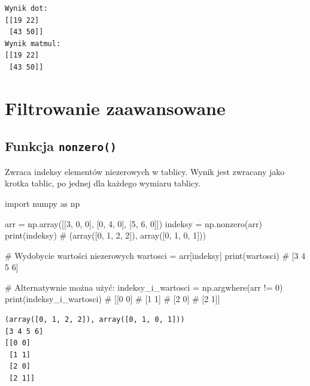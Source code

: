 \documentclass[
  letterpaper,
  DIV=11,
  numbers=noendperiod]{scrreprt}
\newenvironment{Shaded}{\begin{snugshade}}{\end{snugshade}}
\newcommand{\BuiltInTok}[1]{\textcolor[rgb]{0.00,0.23,0.31}{#1}}
\newcommand{\CommentTok}[1]{\textcolor[rgb]{0.37,0.37,0.37}{#1}}
\newcommand{\DecValTok}[1]{\textcolor[rgb]{0.68,0.00,0.00}{#1}}
\newcommand{\ImportTok}[1]{\textcolor[rgb]{0.00,0.46,0.62}{#1}}
\newcommand{\NormalTok}[1]{\textcolor[rgb]{0.00,0.23,0.31}{#1}}
\newcommand{\OperatorTok}[1]{\textcolor[rgb]{0.37,0.37,0.37}{#1}}
\begin{document}
\begin{verbatim}
Wynik dot:
[[19 22]
 [43 50]]
Wynik matmul:
[[19 22]
 [43 50]]
\end{verbatim}

\chapter{Filtrowanie zaawansowane}\label{filtrowanie-zaawansowane}

\section{\texorpdfstring{Funkcja
\texttt{nonzero()}}{Funkcja nonzero()}}\label{funkcja-nonzero}

Zwraca indeksy elementów niezerowych w tablicy. Wynik jest zwracany jako
krotka tablic, po jednej dla każdego wymiaru tablicy.

\begin{Shaded}
\begin{Highlighting}[]
\ImportTok{import}\NormalTok{ numpy }\ImportTok{as}\NormalTok{ np}

\NormalTok{arr }\OperatorTok{=}\NormalTok{ np.array([[}\DecValTok{3}\NormalTok{, }\DecValTok{0}\NormalTok{, }\DecValTok{0}\NormalTok{], [}\DecValTok{0}\NormalTok{, }\DecValTok{4}\NormalTok{, }\DecValTok{0}\NormalTok{], [}\DecValTok{5}\NormalTok{, }\DecValTok{6}\NormalTok{, }\DecValTok{0}\NormalTok{]])}
\NormalTok{indeksy }\OperatorTok{=}\NormalTok{ np.nonzero(arr)}
\BuiltInTok{print}\NormalTok{(indeksy)  }\CommentTok{\# (array([0, 1, 2, 2]), array([0, 1, 0, 1]))}

\CommentTok{\# Wydobycie wartości niezerowych}
\NormalTok{wartosci }\OperatorTok{=}\NormalTok{ arr[indeksy]}
\BuiltInTok{print}\NormalTok{(wartosci)  }\CommentTok{\# [3 4 5 6]}

\CommentTok{\# Alternatywnie można użyć:}
\NormalTok{indeksy\_i\_wartosci }\OperatorTok{=}\NormalTok{ np.argwhere(arr }\OperatorTok{!=} \DecValTok{0}\NormalTok{)}
\BuiltInTok{print}\NormalTok{(indeksy\_i\_wartosci)  }
\CommentTok{\# [[0 0]}
\CommentTok{\#  [1 1]}
\CommentTok{\#  [2 0]}
\CommentTok{\#  [2 1]]}
\end{Highlighting}
\end{Shaded}

\begin{verbatim}
(array([0, 1, 2, 2]), array([0, 1, 0, 1]))
[3 4 5 6]
[[0 0]
 [1 1]
 [2 0]
 [2 1]]
\end{verbatim}
\end{document}
